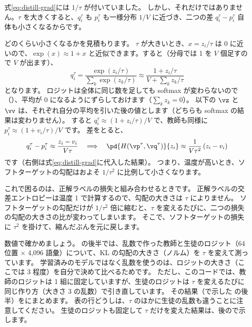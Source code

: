 式\eqref{eq:distill-grad}には $1/\tau$ が付いていました。
しかし、それだけではありません。$\tau$ を大きくすると、$q^\tau_i$ も $p^\tau_i$ も一様分布 $1/V$ に近づき、二つの差 $q^\tau_i-p^\tau_i$ 自体も小さくなるからです。

どのくらい小さくなるかを見積もります。
$\tau$ が大きいとき、$x=z_i/\tau$ は 0 に近いので、$\exp(x)\approx1+x$ と近似できます。すると（分母では 1 を $V$ 個足すので $V$ が出ます）、
\begin{equation}
q^\tau_i=\frac{\exp(z_i/\tau)}{\sum_k\exp(z_k/\tau)}\approx\frac{1+z_i/\tau}{V+\sum_k z_k/\tau}
\end{equation}
となります。
ロジットは全体に同じ数を足しても softmax が変わらないので（）、平均が 0 になるようにずらしておけます（$\sum_k z_k=0$）。
以下の $\vz$ と $\vv$ は、それぞれ自分の平均を引いた後の値とします（どちらも softmax の結果は変わりません）。
すると $q^\tau_i\approx(1+z_i/\tau)/V$ で、教師も同様に $p^\tau_i\approx(1+v_i/\tau)/V$ です。
差をとると、
\begin{equation}
q^\tau_i-p^\tau_i\approx\frac{z_i-v_i}{V\tau}
\quad\Longrightarrow\quad
\pd{H(\vp^\tau,\vq^\tau)}{z_i}\approx\frac{1}{V\tau^2}\,(z_i-v_i)
\label{eq:distill-grad-hot}
\end{equation}
です（右側は式\eqref{eq:distill-grad}に代入した結果）。
つまり、温度が高いとき、ソフトターゲットの勾配はおよそ $1/\tau^2$ に比例して小さくなります\cite{hinton2015distilling}。

これで困るのは、正解ラベルの損失と組み合わせるときです。
正解ラベルの交差エントロピーは温度 1 で計算するので、勾配の大きさは $\tau$ によりません。
ソフトターゲットの勾配だけが $1/\tau^2$ 倍に縮むと、$\tau$ を変えるたびに、二つの損失の勾配の大きさの比が変わってしまいます。
そこで、ソフトターゲットの損失に $\tau^2$ を掛けて、縮んだぶんを元に戻します。

数値で確かめましょう。
 の後半では、乱数で作った教師と生徒のロジット（64 位置 × 4,096 語彙）について、KL の勾配の大きさ（ノルム）を $\tau$ を変えて測っています。
学習済みのモデルではなく乱数を使うのは、ロジットの大きさ（ここでは 3 程度）を自分で決めて比べるためです。
ただし、このコードでは、教師のロジットは 1 組に固定していますが、生徒のロジットは $\tau$ を変えるたびに同じ作り方（大きさ 3 の乱数）で引き直しています。
その結果（で示した  の後半）をにまとめます。
表の行どうしは、$\tau$ のほかに生徒の乱数も違うことに注意してください。
生徒のロジットも固定して $\tau$ だけを変えた結果は、後ので示します。

